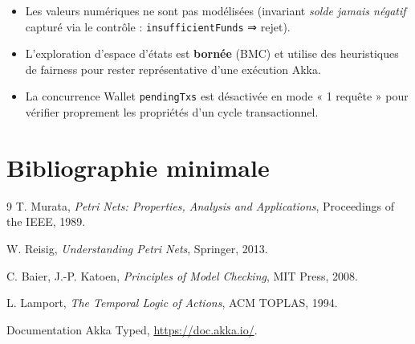 \documentclass[11pt,a4paper]{article}
\begin{document}
\begin{itemize}[leftmargin=*]
  \item Les valeurs numériques ne sont pas modélisées (invariant \emph{solde jamais négatif} capturé via le contrôle : \texttt{insufficientFunds} ⇒ rejet).
  \item L'exploration d'espace d'états est \textbf{bornée} (BMC) et utilise des heuristiques de fairness pour rester représentative d'une exécution Akka.
  \item La concurrence Wallet \texttt{pendingTxs} est désactivée en mode « 1 requête » pour vérifier proprement les propriétés d'un cycle transactionnel.
\end{itemize}

\section{Bibliographie minimale}

\begin{thebibliography}{9}
  T. Murata, \emph{Petri Nets: Properties, Analysis and Applications}, Proceedings of the IEEE, 1989.

  W. Reisig, \emph{Understanding Petri Nets}, Springer, 2013.

  C. Baier, J.-P. Katoen, \emph{Principles of Model Checking}, MIT Press, 2008.

  L. Lamport, \emph{The Temporal Logic of Actions}, ACM TOPLAS, 1994.

  Documentation Akka Typed, \url{https://doc.akka.io/}.
\end{thebibliography}
\end{document}
